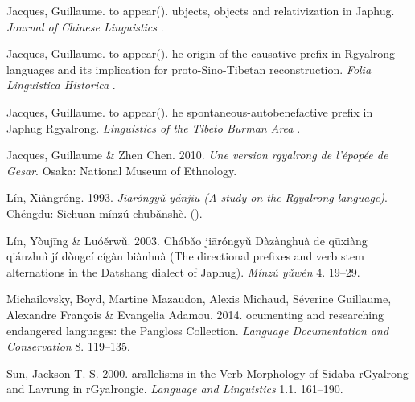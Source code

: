 \begin{thebibliography}{17}
Jacques, Guillaume. to appear{()}.
ubjects, objects and relativization in {J}aphug.
\newblock \emph{Journal of Chinese Linguistics} .

Jacques, Guillaume. to appear{()}.
he origin of the causative prefix in {R}gyalrong languages and its
  implication for proto-{S}ino-{T}ibetan reconstruction.
\newblock \emph{Folia Linguistica Historica} .

Jacques, Guillaume. to appear{()}.
he spontaneous-autobenefactive prefix in {J}aphug {R}gyalrong.
\newblock \emph{Linguistics of the Tibeto Burman Area} .

Jacques, Guillaume \& Zhen Chen. 2010.
\newblock \emph{{U}ne version rgyalrong de l'épopée de {G}esar}.
\newblock Osaka: National Museum of Ethnology.

Lín, Xiàngróng. 1993.
\newblock \emph{ {J}iāróngy\v{u} yánjiū ({A} study on
  the {R}gyalrong language)}.
\newblock {} Chéngdū: Sìchuān mínzú
  chūb\v{a}nshè.
\newblock ().

Lín, Yòujīng \& Luó\v{e}rw\v{u}. 2003.
\newblock {}
  {C}hábǎo jiāróngyǔ {D}àzànghuà de qūxiàng qiánzhuì
  jí dòngcí cígàn biànhuà ({T}he directional prefixes and verb
  stem alternations in the {D}atshang dialect of {J}aphug).
\newblock \emph{ Mínzú y\v{u}wén} 4. 19--29.

Michailovsky, Boyd, Martine Mazaudon, Alexis Michaud, Séverine Guillaume,
  Alexandre François \& Evangelia Adamou. 2014.
ocumenting and researching endangered languages: the {P}angloss
  {C}ollection.
\newblock \emph{Language Documentation and Conservation} 8. 119–135.

Sun, Jackson T.-S. 2000.
arallelisms in the {V}erb {M}orphology of {S}idaba r{G}yalrong and
  {L}avrung in r{G}yalrongic.
\newblock \emph{Language and Linguistics} 1.1. 161--190.


\end{thebibliography}
